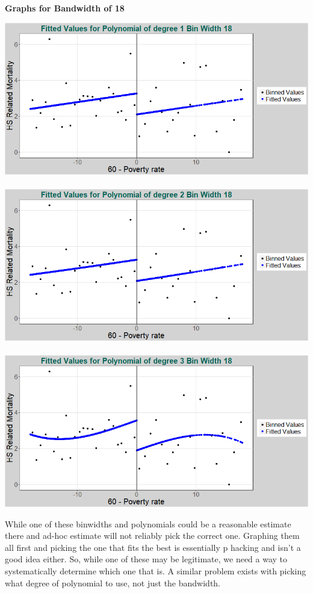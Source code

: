 \documentclass[11pt]{article}
\begin{document}
\begin{center}
	{\large \bf{Graphs for Bandwidth of 18}}
\end{center}

\includegraphics[width=.8\linewidth]{plot_223_poly_1_bw_18.png}
\\ \\
\includegraphics[width=.8\linewidth]{plot_223_poly_2_bw_18.png}
\\ \\
\includegraphics[width=.8\linewidth]{plot_223_poly_3_bw_18.png}


While one of these binwidths and polynomials could be a reasonable estimate there and ad-hoc estimate will not reliably pick the correct one. Graphing them all first and picking the one that fits the best is essentially p hacking and isn't a good idea either. So, while one of these may be legitimate, we need a way to systematically determine which one that is. A similar problem exists with picking what degree of polynomial to use, not just the bandwidth. 
\end{document}
